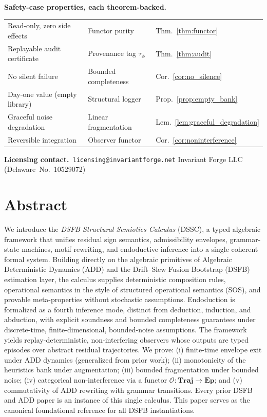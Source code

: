 \documentclass[11pt,a4paper]{article}
\theoremstyle{plain}
\theoremstyle{definition}
\theoremstyle{remark}
\newcommand{\Traj}{\mathbf{Traj}}
\newcommand{\Ep}{\mathbf{Ep}}
\newcommand{\Obs}{\mathcal{O}}
\begin{document}
\begin{tcolorbox}
\medskip
\textbf{Safety-case properties, each theorem-backed.}\\[0.2em]
\begin{tabular}{@{}lll@{}}
Read-only, zero side effects & Functor purity & Thm.~\ref{thm:functor} \\
Replayable audit certificate & Provenance tag $\tau_\phi$ & Thm.~\ref{thm:audit} \\
No silent failure & Bounded completeness & Cor.~\ref{cor:no_silence} \\
Day-one value (empty library) & Structural logger & Prop.~\ref{prop:empty_bank} \\
Graceful noise degradation & Linear fragmentation & Lem.~\ref{lem:graceful_degradation} \\
Reversible integration & Observer functor & Cor.~\ref{cor:noninterference} \\
\end{tabular}

\medskip
\textbf{Licensing contact.}\ \texttt{licensing@invariantforge.net}\quad
Invariant Forge LLC (Delaware~No.~10529072)
\end{tcolorbox}

\bigskip

\section*{Abstract}

We introduce the \emph{DSFB Structural Semiotics Calculus} (DSSC), a typed algebraic framework
that unifies residual sign semantics, admissibility envelopes, grammar-state machines, motif
rewriting, and endoductive inference into a single coherent formal system. Building directly on
the algebraic primitives of Algebraic Deterministic Dynamics (ADD) and the Drift--Slew Fusion
Bootstrap (DSFB) estimation layer, the calculus supplies deterministic composition rules,
operational semantics in the style of structured operational semantics (SOS), and provable
meta-properties without stochastic assumptions. Endoduction is formalized as a fourth inference
mode, distinct from deduction, induction, and abduction, with explicit soundness and bounded
completeness guarantees under discrete-time, finite-dimensional, bounded-noise assumptions. The
framework yields replay-deterministic, non-interfering observers whose outputs are typed episodes
over abstract residual trajectories. We prove: (i) finite-time envelope exit under ADD dynamics
(generalized from prior work); (ii) monotonicity of the heuristics bank under augmentation; (iii)
bounded fragmentation under bounded noise; (iv) categorical non-interference via a functor
$\Obs : \Traj \to \Ep$; and (v) commutativity of ADD rewriting with grammar transitions. Every
prior DSFB and ADD paper is an instance of this single calculus. This paper serves as the
canonical foundational reference for all DSFB instantiations.
\end{document}

